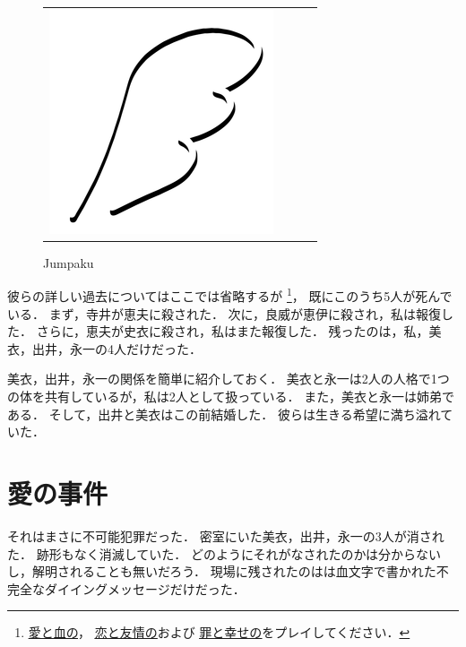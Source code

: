 \begin{figure}[b]
\begin{tabular}{cccc}
\begin{minipage}{0.2\textwidth}\includegraphics[width=\textwidth]{./jumpakuasset/JumpakuMark_250x250.png}\caption{Jumpaku}\label{fig:jumpakuJ}\end{minipage}
\end{tabular}
\end{figure}
彼らの詳しい過去についてはここでは省略するが
\footnote{\href{http://jumpaku.hatenablog.com/entry/2016/04/14/002437}{\underline{愛と血の}}，
\href{http://jumpaku.hatenablog.com/entry/2016/07/24/032632}{\underline{恋と友情の}}および
\href{http://jumpaku.hatenablog.com/entry/2017/07/24/044918}{\underline{罪と幸せの}}をプレイしてください．}，
既にこのうち5人が死んでいる．
まず，寺井が恵夫に殺された．
次に，良威が恵伊に殺され，私は報復した．
さらに，恵夫が史衣に殺され，私はまた報復した．
残ったのは，私，美衣，出井，永一の4人だけだった．

美衣，出井，永一の関係を簡単に紹介しておく．
美衣と永一は2人の人格で1つの体を共有しているが，私は2人として扱っている．
また，美衣と永一は姉弟である．
そして，出井と美衣はこの前結婚した．
彼らは生きる希望に満ち溢れていた．

\section{愛の事件}
それはまさに不可能犯罪だった．
密室にいた美衣，出井，永一の3人が消された．
跡形もなく消滅していた．
どのようにそれがなされたのかは分からないし，解明されることも無いだろう．
現場に残されたのはは血文字で書かれた不完全なダイイングメッセージだけだった．

